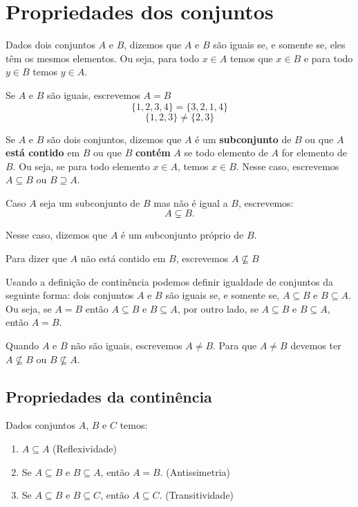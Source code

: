 \section{Propriedades dos conjuntos}

\begin{definicao}
	Dados dois conjuntos $A$ e $B$, dizemos que $A$ e $B$ s{\~a}o iguais se, e somente se, eles t{\^e}m os mesmos elementos. Ou seja, para todo $x \in A$ temos que $x \in B$ e para todo $y \in B$ temos $y \in A$.
\end{definicao}

Se $A$ e $B$ s{\~a}o iguais, escrevemos $A = B$
\[ \{1,2,3,4\} = \{3,2,1,4\} \]
\[ \{1,2,3\} \neq \{2,3\} \]

\begin{definicao}
	Se $A$ e $B$ s{\~a}o dois conjuntos, dizemos que $A$ {\'e} um \textbf{subconjunto} de $B$ ou que $A$ \textbf{est\'a contido} em $B$ ou que $B$ \textbf{cont\'em} $A$ se todo elemento de $A$ for elemento de $B$. Ou seja, se para todo elemento $x \in A$, temos $x \in B$. Nesse caso, escrevemos $A \subseteq B$ ou $B \supseteq A$.
\end{definicao}


Caso $A$ seja um subconjunto de $B$ mas n{\~a}o {\'e} igual a $B$, escrevemos:
\[
A \subsetneq B.
\]

Nesse caso, dizemos que $A$ {\'e} um subconjunto pr{\'o}prio de $B$.

Para dizer que $A$ n{\~a}o est{\'a} contido em $B$, escrevemos $A \nsubseteq B$

Usando a defini\c{c}\~ao de contin\^encia podemos definir igualdade de conjuntos da seguinte forma: dois conjuntos $A$ e $B$ s\~ao iguais se, e somente se, $A \subseteq B$ e $B \subseteq A$. Ou seja, se $A = B$ ent{\~a}o $A \subseteq B$ e $B \subseteq A$, por outro lado, se $A \subseteq B$ e $B \subseteq A$, ent{\~a}o $A = B$.

Quando $A$ e $B$ n{\~a}o s{\~a}o iguais, escrevemos $A \neq B$. Para que $A \neq B$ devemos ter $A \nsubseteq B$ ou $B \nsubseteq A$.

\subsection{Propriedades da contin{\^e}ncia}
Dados conjuntos $A$, $B$ e $C$ temos:
\begin{enumerate}
\item $A\subseteq A$ (Reflexividade)
\item Se $A\subseteq B \mbox{ e } B\subseteq A$, ent{\~a}o $A=B$. (Antissimetria)
\item Se $A\subseteq B$ e $B\subseteq C$, ent{\~a}o $A\subseteq C$. (Transitividade)
\end{enumerate}

